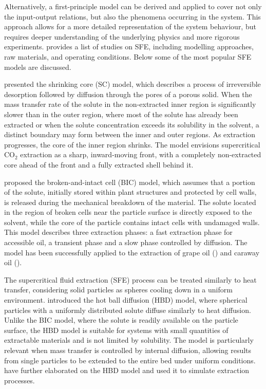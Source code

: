 \documentclass[a4paper,fleqn]{cas-dc}
\begin{document}
Alternatively, a first-principle model can be derived and applied to cover not only the input-output relations, but also the phenomena occurring in the system. This approach allows for a more detailed representation of the system behaviour, but requires deeper understanding of the underlying physics and more rigorous experiments. \citet{Sliczniuk2025a} provides a list of studies on SFE, including modelling approaches, raw materials, and operating conditions. Below some of the most popular SFE models are discussed.

\citet{Goto1996} presented the shrinking core (SC) model, which describes a process of irreversible desorption followed by diffusion through the pores of a porous solid. When the mass transfer rate of the solute in the non-extracted inner region is significantly slower than in the outer region, where most of the solute has already been extracted or when the solute concentration exceeds its solubility in the solvent, a distinct boundary may form between the inner and outer regions. As extraction progresses, the core of the inner region shrinks. The model envisions supercritical CO$_2$ extraction as a sharp, inward-moving front, with a completely non-extracted core ahead of the front and a fully extracted shell behind it.

\citet{Sovova1994} proposed the broken-and-intact cell (BIC) model, which assumes that a portion of the solute, initially stored within plant structures and protected by cell walls, is released during the mechanical breakdown of the material. The solute located in the region of broken cells near the particle surface is directly exposed to the solvent, while the core of the particle contains intact cells with undamaged walls. This model describes three extraction phases: a fast extraction phase for accessible oil, a transient phase and a slow phase controlled by diffusion. The model has been successfully applied to the extraction of grape oil (\citet{Sovova1994b}) and caraway oil (\citet{Sovova1994a}).

The supercritical fluid extraction (SFE) process can be treated similarly to heat transfer, considering solid particles as spheres cooling down in a uniform environment. \citet{Bartle1990} introduced the hot ball diffusion (HBD) model, where spherical particles with a uniformly distributed solute diffuse similarly to heat diffusion. Unlike the BIC model, where the solute is readily available on the particle surface, the HBD model is suitable for systems with small quantities of extractable materials and is not limited by solubility. The model is particularly relevant when mass transfer is controlled by internal diffusion, allowing results from single particles to be extended to the entire bed under uniform conditions. \citet{Reverchon1993} have further elaborated on the HBD model and used it to simulate extraction processes.
\end{document}
